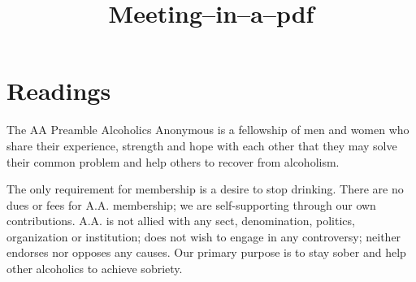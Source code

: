 \documentclass{beamer}
\title{Meeting--in--a--pdf}
\author{}
\institute{Formatted for screen sharing}
\date{}
\begin{document}
    \begin{frame}
        \maketitle
    \end{frame}
    
    \section*{Readings}
  
       \begin{frame}[plain]\large
       \begin{exampleblock}{The AA Preamble}
Alcoholics Anonymous is a fellowship of men and
women who share their experience, strength and
hope with each other that they may solve their
common problem and help others to recover from
alcoholism.
\bigskip

The only requirement for membership is a desire
to stop drinking. There are no dues or fees for
A.A. membership; we are self-supporting through
our own contributions. A.A. is not allied with any
sect, denomination, politics, organization or
institution; does not wish to engage in any
controversy; neither endorses nor opposes any
causes. Our primary purpose is to stay sober and
help other alcoholics to achieve sobriety.
\end{exampleblock}
    \end{frame}
   
\end{document}
